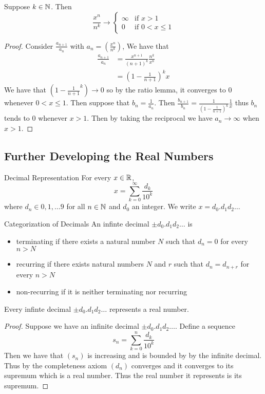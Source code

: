 \documentclass[a4paper]{article}
\begin{document}
\begin{thm}{}{} Suppose $k\in\mathbb{N}$. Then
$$\frac{x^n}{n^k}\to\begin{cases}
\infty & \text{if $x>1$} \\
0 & \text{if $0<x\leq1$} 
\end{cases}$$\tcbline
\begin{proof} Consider $\frac{a_{n+1}}{a_n}$ with $a_n=\left(\frac{x^n}{n^k}\right)$, We have that 
\begin{align*}
\frac{a_{n+1}}{a_n}&=\frac{x^{n+1}}{(n+1)^k}\frac{n^k}{x^n} \\
&=\left(1-\frac{1}{n+1}\right)^kx
\end{align*}
We have that $\left(1-\frac{1}{n+1}^k\right)\to 0$ so by the ratio lemma, it converges to $0$ whenever $0<x\leq1$. Then suppose that $b_n=\frac{1}{a_n}$. Then $\frac{b_{n+1}}{b_n}=\frac{1}{\left(1-\frac{1}{n+1}\right)^k}\frac{1}{x}$ thus $b_n$ tends to $0$ whenever $x>1$. Then by taking the reciprocal we have $a_n\to\infty$ when $x>1$. 
\end{proof}
\end{thm}

\subsection{Further Developing the Real Numbers}
\begin{defn}{Decimal Representation}{} For every $x\in\mathbb{R}$, $$x=\sum_{k=0}^{\infty}\frac{d_k}{10^k}$$ where $d_n\in{0,1,\dots9}$ for all $n\in\mathbb{N}$ and $d_0$ an integer. We write $x=d_0.d_1d_2\dots$
\end{defn}

\begin{defn}{Categorization of Decimals}{} An infinte decimal $\pm d_0.d_1d_2\dots$ is
\begin{itemize}
\item terminating if there exists a natural number $N$ such that $d_n=0$ for every $n>N$
\item recurring if there exists natural numbers $N$ and $r$ such that $d_n=d_{n+r}$ for every $n>N$
\item non-recurring if it is neither terminating nor recurring
\end{itemize}
\end{defn}

\begin{thm}{}{} Every infinte decimal $\pm d_0.d_1d_2\dots$ represents a real number. \tcbline
\begin{proof} Suppose we have an infinite decimal $\pm d_0.d_1d_2\dots$. Define a sequence $$s_n=\sum_{k=0}^{n}\frac{d_k}{10^k}$$ Then we have that $(s_n)$ is increasing and is bounded by by the infinite decimal. Thus by the completeness axiom $(d_n)$ converges and it converges to its supremum which is a real number. Thus the real number it represents is its supremum. 
\end{proof}
\end{thm}
\end{document}
